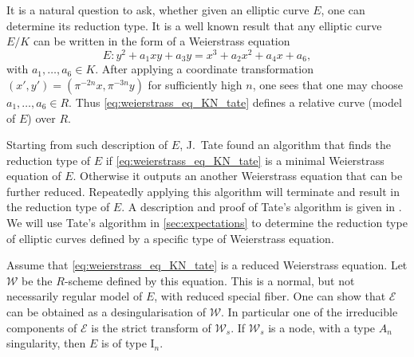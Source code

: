 It is a natural question to ask, whether given an elliptic curve $E$, one can determine its reduction type. 
It is a well known result that any elliptic curve $E / K$ can be written in the form of a Weierstrass equation \begin{equation}\label{eq:weierstrass_eq_KN_tate}
E: y^2 +a_1 xy + a_3 y= x^3 + a_2 x^2 + a_4 x + a_6
,\end{equation}
with $a_1, \ldots, a_6 \in K$. 
After applying a coordinate transformation $(x', y') = (\pi^{-2n}x, \pi^{-3n} y)$ for sufficiently high $n$, one sees that one may choose  $a_1, \ldots, a_6 \in R$.
Thus \eqref{eq:weierstrass_eq_KN_tate} defines a relative curve (model of $E$) over  $R$. 

Starting from such description of $E$, J.\ Tate found an algorithm that finds the reduction type of $E$ if \eqref{eq:weierstrass_eq_KN_tate} is a minimal Weierstrass equation of  $E$. 
Otherwise it outputs an another Weierstrass equation that can be further reduced. 
Repeatedly applying this algorithm will terminate and result in the reduction type of $E$. 
A description and proof of Tate's algorithm is given in \cite[sec.\ IV.9]{silvermanAdvancedTopicsArithmetic1994}.
We will use Tate's algorithm in \cref{sec:expectations} to determine the reduction type of elliptic curves defined by a specific type of Weierstrass equation.

\medskip

Assume that \eqref{eq:weierstrass_eq_KN_tate} is a reduced Weierstrass equation. 
Let $\mathscr W $ be the $R$-scheme defined by this equation. 
This is a normal, but not necessarily regular model of $E$, with reduced special fiber. 
One can show that $\mathscr E$ can be obtained as a desingularisation of $\mathscr W$. 
In particular one of the irreducible components of $\mathscr E$ is the strict transform of $\mathscr W_s$. 
If $\mathscr W_s$ is a node, with a type $A_n$ singularity, then $E$ is of type $\mathrm I_n$. 
